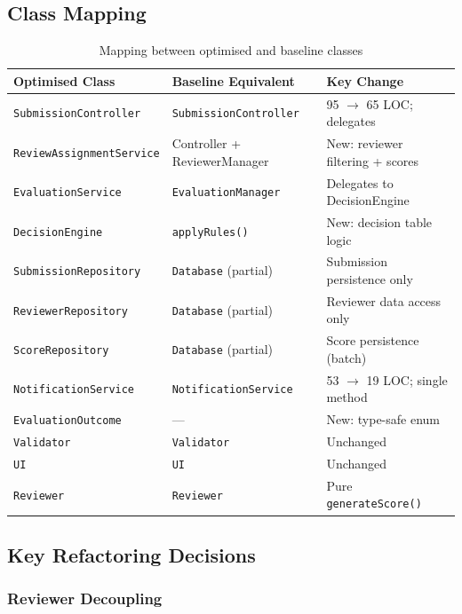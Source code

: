\documentclass[12pt, a4paper]{article}
\begin{document}
\subsection{Class Mapping}

\begin{table}[h]
\centering
\caption{Mapping between optimised and baseline classes}
\label{tab:class-mapping}
\begin{tabularx}{\textwidth}{l l X}
    \toprule
    \textbf{Optimised Class} & \textbf{Baseline Equivalent} & \textbf{Key Change} \\
    \midrule
    \texttt{SubmissionController} & \texttt{SubmissionController} & 95 $\rightarrow$ 65 LOC; delegates \\
    \texttt{ReviewAssignmentService} & Controller + ReviewerManager & New: reviewer filtering + scores \\
    \texttt{EvaluationService} & \texttt{EvaluationManager} & Delegates to DecisionEngine \\
    \texttt{DecisionEngine} & \texttt{applyRules()} & New: decision table logic \\
    \texttt{SubmissionRepository} & \texttt{Database} (partial) & Submission persistence only \\
    \texttt{ReviewerRepository} & \texttt{Database} (partial) & Reviewer data access only \\
    \texttt{ScoreRepository} & \texttt{Database} (partial) & Score persistence (batch) \\
    \texttt{NotificationService} & \texttt{NotificationService} & 53 $\rightarrow$ 19 LOC; single method \\
    \texttt{EvaluationOutcome} & --- & New: type-safe enum \\
    \texttt{Validator} & \texttt{Validator} & Unchanged \\
    \texttt{UI} & \texttt{UI} & Unchanged \\
    \texttt{Reviewer} & \texttt{Reviewer} & Pure \texttt{generateScore()} \\
    \bottomrule
\end{tabularx}
\end{table}

\subsection{Key Refactoring Decisions}

\subsubsection{Reviewer Decoupling}
\end{document}
